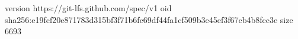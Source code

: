 version https://git-lfs.github.com/spec/v1
oid sha256:e19fcf20e871783d315bf3f71b6fc69df44fa1cf509b3e45ef3f67cb4b8fcc3e
size 6693
